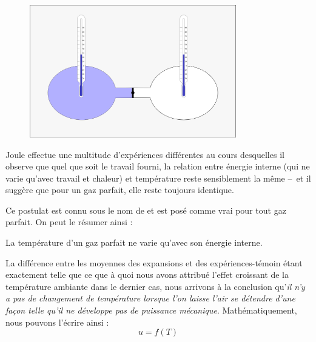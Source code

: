 		\begin{figure}
			\begin{center}
				\includegraphics[width=9cm]{images/detente_joule_gay-lussac.png}
			\end{center}
			\label{fig_detente_joule}
		\end{figure}

		Joule effectue une multitude d’expériences différentes au cours desquelles il observe que quel que soit le travail fourni, la relation entre énergie interne (qui ne varie qu’avec travail et chaleur) et température reste sensiblement la même --\ et il suggère que pour un gaz parfait, elle reste toujours identique.

		Ce postulat est connu sous le nom de  et est posé comme vrai pour tout gaz parfait. On peut le résumer ainsi :

		\begin{trucimportant}
			La température d’un gaz parfait ne varie qu’avec son énergie interne.
		\end{trucimportant}


La différence entre les moyennes des expansions et des expériences-témoin étant exactement telle que ce que à quoi nous avons attribué l’effet croissant de la température ambiante dans le dernier cas, nous arrivons à la conclusion qu’\emph{il n’y a pas de changement de température lorsque l’on laisse l’air se détendre d’une façon telle qu’il ne développe pas de puissance mécanique}.
		Mathématiquement, nous pouvons l’écrire ainsi :
		\begin{equation}
			u = f(T)
		\end{equation}

